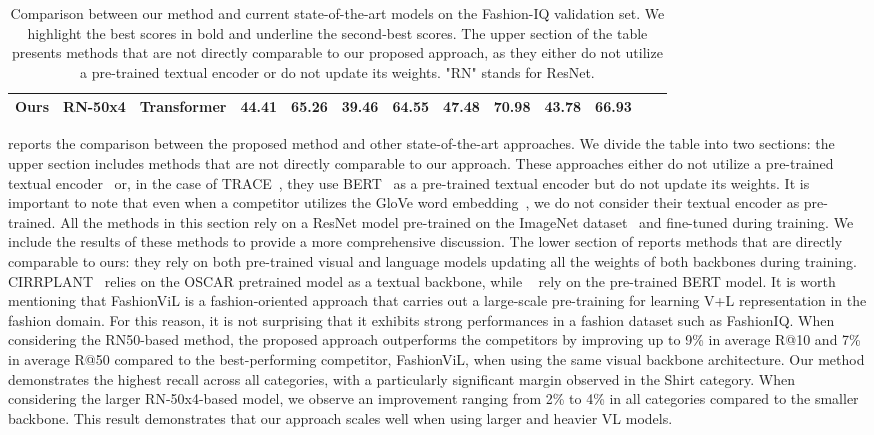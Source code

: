 \documentclass[acmlarge]{acmart}
\begin{document}
\begin{table}[t]
{\begin{tabular}{lcccc  cc cc cc  cc}
\rowcolor{LightCyan}
\textbf{Ours} & RN-50x4 & Transformer & \textbf{44.41} & \textbf{65.26} & \textbf{39.46} & \textbf{64.55} & \textbf{47.48} & \textbf{70.98} & \textbf{43.78} & \textbf{66.93}\\ \bottomrule \end{tabular}
}
\caption{Comparison between our method and current state-of-the-art models on the Fashion-IQ validation set. We highlight the best scores in bold and underline the second-best scores. The upper section of the table presents methods that are not directly comparable to our proposed approach, as they either do not utilize a pre-trained textual encoder or do not update its weights. "RN" stands for ResNet.}
\label{tab:fashioniq-comparison}
\vspace{-4ex}
\end{table}


 reports the comparison between the proposed method and other state-of-the-art approaches. 
We divide the table into two sections: the upper section includes methods that are not directly comparable to our approach. These approaches either do not utilize a pre-trained textual encoder~\cite{Chen_2020_CVPR, yu2020curlingnet, shin2021rtic, Lee_2021_CVPR, Kim_Yu_Kim_Kim_2021,clvc-net} or, in the case of TRACE~\cite{jandial2020trace}, they use BERT~\cite{devlin2019bert} as a pre-trained textual encoder but do not update its weights. 
It is important to note that even when a competitor \cite{Chen_2020_CVPR, shin2021rtic, Kim_Yu_Kim_Kim_2021} utilizes the GloVe word embedding~\cite{pennington2014glove}, we do not consider their textual encoder as pre-trained.
All the methods in this section rely on a ResNet model pre-trained on the ImageNet dataset~\cite{russakovsky2015imagenet} and fine-tuned during training. We include the results of these methods to provide a more comprehensive discussion.
The lower section of  reports methods that are directly comparable to ours: they rely on both pre-trained visual and language models updating all the weights of both backbones during training.
CIRRPLANT~\cite{liu2021image} relies on the OSCAR pretrained model as a textual backbone, while ~\cite{dodds2020modality, Jandial_2022_WACV, han2022fashionvil} rely on the pre-trained BERT model. It is worth mentioning that FashionViL is a fashion-oriented approach that carries out a large-scale pre-training for learning V+L representation in the fashion domain. For this reason, it is not surprising that it exhibits strong performances in a fashion dataset such as FashionIQ.
When considering the RN50-based method, the proposed approach outperforms the competitors by improving up to 9\% in average R@10 and 7\% in average R@50 compared to the best-performing competitor, FashionViL, when using the same visual backbone architecture. Our method demonstrates the highest recall across all categories, with a particularly significant margin observed in the Shirt category.
When considering the larger RN-50x4-based model, we observe an improvement ranging from 2\% to 4\% in all categories compared to the smaller backbone. This result demonstrates that our approach scales well when using larger and heavier VL models.
\end{document}
